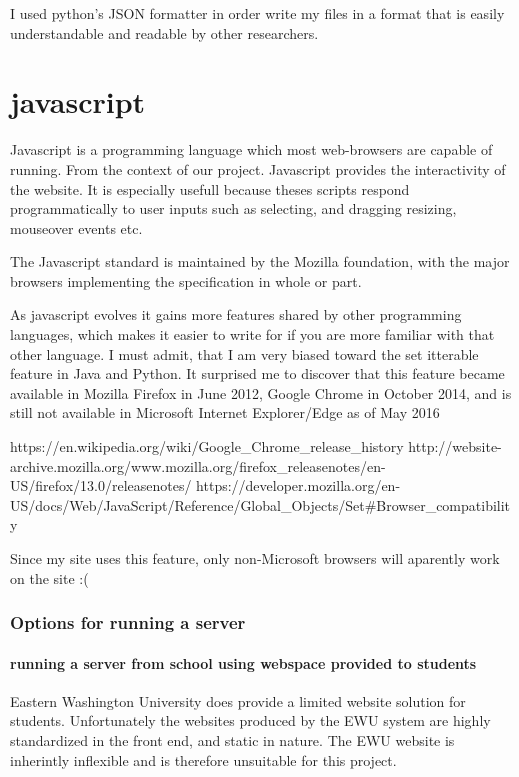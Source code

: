 {I used python's JSON formatter in order write my files in a format that is easily understandable and readable by other researchers.


\chapter{javascript}

Javascript is a programming language which most web-browsers are capable of running.  From the context of our project.  Javascript provides the interactivity of the website.  It is especially usefull because theses scripts respond programmatically to user inputs such as selecting, and dragging resizing, mouseover events etc.

The Javascript standard is maintained by the Mozilla foundation, with the major browsers implementing the specification in whole or part.

As javascript evolves it gains more features shared by other programming languages, which makes it easier to write for if you are more familiar with that other language.  I must admit, that I am very biased toward the set itterable feature in Java and Python.  It surprised me to discover that this feature became available in Mozilla Firefox in June 2012, Google Chrome in October 2014, and is still not available in Microsoft Internet Explorer/Edge as of May 2016

https://en.wikipedia.org/wiki/Google\_Chrome\_release\_history
http://website-archive.mozilla.org/www.mozilla.org/firefox\_releasenotes/en-US/firefox/13.0/releasenotes/
https://developer.mozilla.org/en-US/docs/Web/JavaScript/Reference/Global\_Objects/Set\#Browser\_compatibility

Since my site uses this feature, only non-Microsoft browsers will aparently work on the site :(

\subsection{Options for running a server}

\subsubsection{running a server from school using webspace provided to students}

Eastern Washington University does provide a limited website solution for students.  Unfortunately the websites produced by the EWU system are highly standardized in the front end, and static in nature.  The EWU website is inherintly inflexible and is therefore unsuitable for this project.

}

